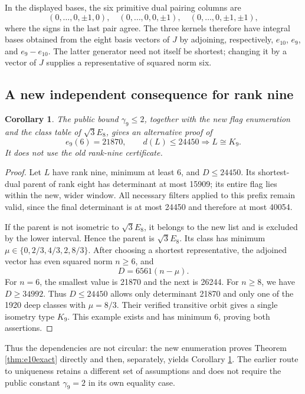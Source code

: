\documentclass[11pt,a4paper]{article}
\newtheorem{corollary}[theorem]{Corollary}
\theoremstyle{remark}\newtheorem{remark}[theorem]{Remark}
\begin{document}
In the displayed bases, the six primitive dual pairing columns are
\[
 (0,\ldots,0,\pm1,0),\quad
 (0,\ldots,0,0,\pm1),\quad
 (0,\ldots,0,\pm1,\pm1),
\]
where the signs in the last pair agree. The three kernels therefore
have integral bases obtained from the eight basis vectors of $J$ by
adjoining, respectively, $e_{10}$, $e_9$, and $e_9-e_{10}$.
The latter generator need not itself be shortest; changing it by a
vector of $J$ supplies a representative of squared norm six.


\subsection{A new independent consequence for rank nine}

\begin{corollary}\label{cor:newrank9}
The public bound $\gamma_9\le2$, together with the new flag enumeration and the class table of $\sqrt3E_8$, gives an alternative proof of
\[
e_9(6)=21870,\qquad d(L)\le24450\Longrightarrow L\cong K_9.
\]
It does not use the old rank-nine certificate.
\end{corollary}

\begin{proof}
Let $L$ have rank nine, minimum at least 6, and $D\le24450$. Its shortest-dual parent of rank eight has determinant at most 15909; its entire flag lies within the new, wider window. All necessary filters applied to this prefix remain valid, since the final determinant is at most 24450 and therefore at most 40054.

If the parent is not isometric to $\sqrt3E_8$, it belongs to the new list and is excluded by the lower interval. Hence the parent is $\sqrt3E_8$. Its class has minimum $\mu\in\{0,2/3,4/3,2,8/3\}$. After choosing a shortest representative, the adjoined vector has even squared norm $n\ge6$, and
\[
D=6561(n-\mu).
\]
For $n=6$, the smallest value is 21870 and the next is 26244. For $n\ge8$, we have $D\ge34992$. Thus $D\le24450$ allows only determinant 21870 and only one of the 1920 deep classes with $\mu=8/3$. Their verified transitive orbit gives a single isometry type $K_9$. This example exists and has minimum 6, proving both assertions.
\end{proof}

Thus the dependencies are not circular: the new enumeration proves Theorem \ref{thm:e10exact} directly and then, separately, yields Corollary \ref{cor:newrank9}. The earlier route to uniqueness retains a different set of assumptions and does not require the public constant $\gamma_9=2$ in its own equality case.
\end{document}
